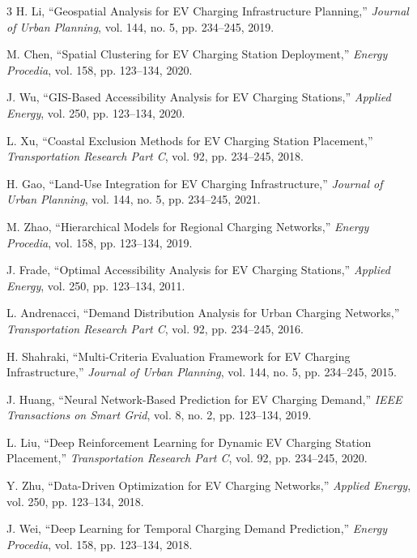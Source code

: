 \documentclass[journal]{IEEEtran}
\begin{document}
\begin{thebibliography}{3}
H. Li, ``Geospatial Analysis for EV Charging Infrastructure Planning,'' \emph{Journal of Urban Planning}, vol. 144, no. 5, pp. 234--245, 2019.

M. Chen, ``Spatial Clustering for EV Charging Station Deployment,'' \emph{Energy Procedia}, vol. 158, pp. 123--134, 2020.

J. Wu, ``GIS-Based Accessibility Analysis for EV Charging Stations,'' \emph{Applied Energy}, vol. 250, pp. 123--134, 2020.

L. Xu, ``Coastal Exclusion Methods for EV Charging Station Placement,'' \emph{Transportation Research Part C}, vol. 92, pp. 234--245, 2018.

H. Gao, ``Land-Use Integration for EV Charging Infrastructure,'' \emph{Journal of Urban Planning}, vol. 144, no. 5, pp. 234--245, 2021.

M. Zhao, ``Hierarchical Models for Regional Charging Networks,'' \emph{Energy Procedia}, vol. 158, pp. 123--134, 2019.

J. Frade, ``Optimal Accessibility Analysis for EV Charging Stations,'' \emph{Applied Energy}, vol. 250, pp. 123--134, 2011.

L. Andrenacci, ``Demand Distribution Analysis for Urban Charging Networks,'' \emph{Transportation Research Part C}, vol. 92, pp. 234--245, 2016.

H. Shahraki, ``Multi-Criteria Evaluation Framework for EV Charging Infrastructure,'' \emph{Journal of Urban Planning}, vol. 144, no. 5, pp. 234--245, 2015.

J. Huang, ``Neural Network-Based Prediction for EV Charging Demand,'' \emph{IEEE Transactions on Smart Grid}, vol. 8, no. 2, pp. 123--134, 2019.

L. Liu, ``Deep Reinforcement Learning for Dynamic EV Charging Station Placement,'' \emph{Transportation Research Part C}, vol. 92, pp. 234--245, 2020.

Y. Zhu, ``Data-Driven Optimization for EV Charging Networks,'' \emph{Applied Energy}, vol. 250, pp. 123--134, 2018.

J. Wei, ``Deep Learning for Temporal Charging Demand Prediction,'' \emph{Energy Procedia}, vol. 158, pp. 123--134, 2018.


\end{thebibliography}
\end{document}
